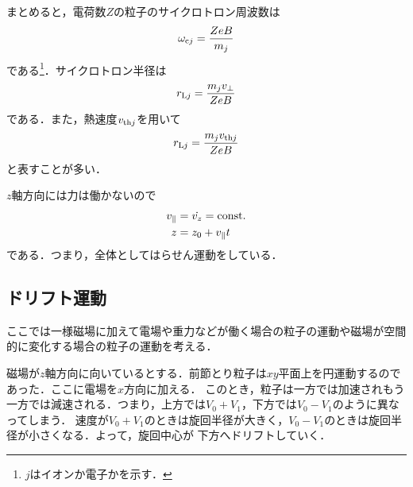 \documentclass{report}
\begin{document}
      まとめると，電荷数$Z$の粒子のサイクロトロン周波数は
      \begin{align}
        \omega_{\mathrm{c}j} = \frac{Z e B}{m_j}
      \end{align}
      である\footnote{$j$はイオンか電子かを示す．}．サイクロトロン半径は
      \begin{align}
        r_{\mathrm{L}j} = \frac{m_j v_{\perp}}{ZeB}
      \end{align}
      である．また，熱速度$v_{{\mathrm{th}}j}$を用いて
      \begin{align}
        r_{\mathrm{L}j} = \frac{m_j v_{{\mathrm{th}}j}}{ZeB}
      \end{align}
      と表すことが多い．

      $z$軸方向には力は働かないので
      \begin{align}
        v_{\parallel} &= \dot{v_z} = \mathrm{const.}\\
        z &= z_0 + v_{\parallel}t
      \end{align}
      である．つまり，全体としてはらせん運動をしている．

    \subsection{ドリフト運動}
      
      ここでは一様磁場に加えて電場や重力などが働く場合の粒子の運動や磁場が空間的に変化する場合の粒子の運動を考える．

      磁場が$z$軸方向に向いているとする．前節とり粒子は$xy$平面上を円運動するのであった．ここに電場を$x$方向に加える．
      このとき，粒子は一方では加速されもう一方では減速される．つまり，上方では$V_0+V_1$，下方では$V_0-V_1$のように異なってしまう．
      速度が$V_0+V_1$のときは旋回半径が大きく，$V_0-V_1$のときは旋回半径が小さくなる．よって，旋回中心が
      下方へドリフトしていく．
\end{document}
